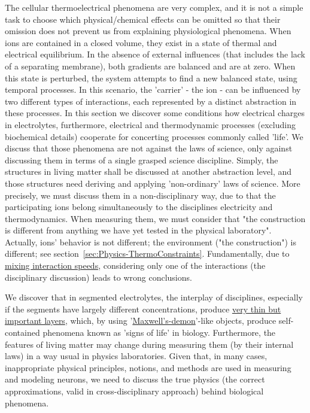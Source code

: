 	
The cellular thermoelectrical phenomena are very complex, and it is
not a simple task to choose which physical/chemical effects can be
omitted so that their omission does not prevent us from explaining
physiological phenomena. 
When ions are contained in a closed volume,
they exist in a state of thermal and electrical equilibrium.
In the absence of external influences (that includes the lack of a separating membrane),
both gradients are balanced and are at zero.
When this state is perturbed, the system attempts to find a 
new balanced state, using temporal processes.
In this scenario, the 'carrier' - the ion - can be influenced by two different types of interactions, each represented by a distinct abstraction in these processes.
In this section we  discover some conditions how electrical charges in electrolytes, furthermore, electrical and thermodynamic processes (excluding biochemical details)
cooperate for concerting processes commonly called 'life'.
We discuss that those phenomena are not against the laws of science, only against discussing them in terms of a single grasped science discipline. 
Simply, the structures in living matter shall be 
discussed at another abstraction level, and those structures  need deriving and applying 'non-ordinary' laws of science.
More precisely, we must discuss them in a non-disciplinary way, due to that the participating ions belong simultaneously to the disciplines electricity and thermodynamics.
When measuring them, we must consider that "the construction is different from anything we have yet tested in the physical laboratory".
Actually, ions' behavior is not different; the environment ("the construction") is different; see section~\ref{sec:Physics-ThermoConstraints}. 
Fundamentally, due to \hyperlink{MixingSpeeds}{mixing interaction speeds}, considering only one of the interactions (the disciplinary discussion) leads to wrong conclusions.

	
We discover that in segmented electrolytes, the interplay of disciplines, especially if the segments have largely different concentrations, produce \hyperlink{DynamicLayer}
{very thin but important layers}, which, by using '\hyperlink{Maxwell-demon}
{Maxwell's-demon}'-like objects, produce self-contained phenomena known as 'signs of life' in biology.
Furthermore, the features of living matter may change during measuring 
them (by their internal laws) in a way usual in physics laboratories.
Given that, in many cases, inappropriate physical principles, notions, and methods are used in
measuring and modeling neurons,
we need to discuss 
the true physics (the correct approximations, valid in cross-disciplinary approach)
behind biological phenomena.

